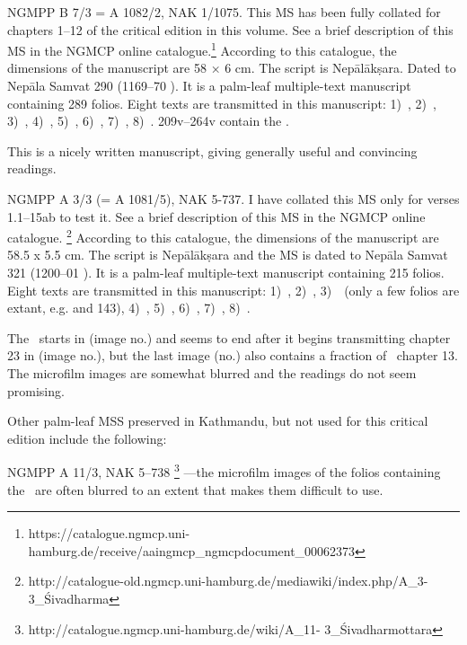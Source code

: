 NGMPP B 7/3 = A 1082/2, NAK 1/1075. This MS has been 
fully collated for chapters 1--12 of
the critical edition in this volume. See a brief description of this MS
in the NGMCP online catalogue.\footnote{https://catalogue.ngmcp.uni-hamburg.de/receive/aaingmcp\_ngmcpdocument\_00062373}
According to this catalogue, the dimensions of the manuscript are 
58 × 6 cm. The script is Nepālākṣara. Dated to Nepāla Samvat 
290 (1169--70 \CE). It is a
palm-leaf multiple-text manuscript containing 289 folios. Eight texts
are transmitted in this manuscript: 
1)~\SDhS,
2)~\SDhU,
3)~\SDhSangr,
4)~\Ums,
5)~\SivaUp,
6)~\Vss,
7)~\Uums,
8)~\DharmP.
\Fols209v--264v contain the \VSS.

This is a nicely written manuscript, giving generally useful and
convincing readings. 


NGMPP A 3/3 (= A 1081/5), NAK 5-737. I have collated 
this MS only for verses 1.1--15ab to test it. 
See a brief description of this MS in the NGMCP online
catalogue.%
	\footnote{http://catalogue-old.ngmcp.uni-hamburg.de/mediawiki/index.php/A\_3-3\_Śivadharma} 
According to this catalogue, the dimensions of the manuscript are
58.5 x 5.5 cm. The script is Nepālākṣara and the MS is dated 
to Nepāla Samvat 321 (1200--01 \CE). It is a palm-leaf multiple-text manuscript containing 215 folios.
Eight texts are transmitted in this manuscript: 
1)~\SDhS,
2)~\SDhU,
3)~\SDhSangr\ (only a few folios are extant, e.g.  and 143), 
4)~\Ums,
5)~\SivaUp,
6)~\Uums,
7)~\Vss,
8)~\DharmP.

The \VSS\ starts in  (image no.) 
and seems to end after it begins transmitting chapter 23 
in  (image no.), but the last image 
(no.) also contains a fraction of \VSS\ chapter 13.
The microfilm images are somewhat blurred and the 
readings do not seem promising.


\bigskip

\noindent
Other palm-leaf MSS preserved in Kathmandu, but not used for
this critical edition include the following:

NGMPP A 11/3, NAK 5--738%
	\footnote{http://catalogue.ngmcp.uni-hamburg.de/wiki/A\_11- 3\_Śivadharmottara}%
---the microfilm images of the folios containing the \VSS\ are often blurred to an extent that makes them
difficult to use.


